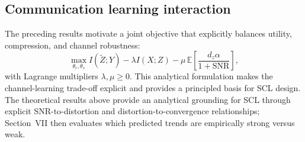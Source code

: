 \documentclass[10pt,journal]{IEEEtran}
\begin{document}
\subsection{Communication learning interaction}
The preceding results motivate a joint objective that explicitly balances utility, compression, and channel robustness:
\begin{equation}
\max_{\theta_c,\theta_s}
I(\tilde{Z};Y)
-
\lambda I(X;Z)
-
\mu\,\mathbb{E}\left[\frac{d_z\alpha}{1+\mathrm{SNR}}\right],
\end{equation}
with Lagrange multipliers $\lambda,\mu\ge0$. This analytical formulation makes the channel-learning trade-off explicit and provides a principled basis for SCL design.
The theoretical results above provide an analytical grounding for SCL through explicit SNR-to-distortion and distortion-to-convergence relationships; Section~VII then evaluates which predicted trends are empirically strong versus weak.
\end{document}
